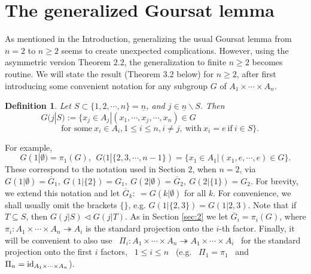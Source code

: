 \documentclass[11pt]{article}
\theoremstyle{change}
\newtheorem{Def}[Thm]{Definition}
\newcommand{\<}{\langle}
\renewcommand{\>}{\rangle}
\begin{document}





\section{The generalized Goursat lemma } \label{sec:3}

As mentioned in the Introduction, generalizing the usual Goursat lemma from $n=2$ to $n\geq 2$ seems to create unexpected complications. However, using the asymmetric version Theorem $2.2$, the generalization to finite $n\geq 2$ becomes routine. We will state the result (Theorem 3.2 below) for $n\geq 2$,
after
first introducing some convenient notation for any subgroup $G$ of  $A_1\times \cdots \times A_n$.

\begin{Def}\label{d:3.1}
 Let $S\subset \{1,2,\cdots,n\}=\underline{n}$, and $j\in \underline{n}\smallsetminus S$. Then $$G(j|S):=\{x_j\in A_j|(x_1,\cdots,x_j,\cdots,x_n)\in G~~~~~~~~~~~~~~~~~~~~~~~~~~~~~~~~~~~~~~~~$$ $$~~~~~\mbox{for some}~x_i\in A_i, 1\leq i \leq n, i\neq j,
 ~\mbox{with}~x_i=e ~\mbox{if}~i\in S \}.$$
\end{Def}
For example, $$G(1|\emptyset)=\pi_1(G),~~G(1|\{2,3,\cdots, n-1\})=\{x_1\in A_1|(x_1,e,\cdots,e)\in G\}.$$ These correspond to the notation used in Section $2$, when $n=2$, via $G(1|\emptyset)=\overline{G}_1, ~G(1|\{2\})=G_1, ~G(2|\emptyset)=\overline{G}_2, ~G(2|\{1\})=G_2.$   For brevity, we extend this notation and let $\overline{G}_k :~= G(k|\emptyset)$ for all $k$.  
For convenience, we shall usually omit the brackets $\{\}$, e.g. $G(1|\{2,3\})=G(1|2,3)$. Note that if $T\subseteq S$, then $G(j|S)\lhd G(j|T)$.
As in Section \ref{sec:2} we let $\overline{G}_i=\pi_i(G)$, where $\pi_i:A_1\times \cdots \times A_n \twoheadrightarrow A_i$ is the standard projection onto the $i$-th factor.
Finally, it will be convenient to also use \ $\Pi_i : A_1 \times \cdots \times A_n 
\twoheadrightarrow  A_1 \times \cdots \times A_i$ \ for the standard projection onto the
first $i$ factors, \ $1 \leq i \leq n$ \ (e.g. \ $\Pi_1 = \pi_1$ \ and \ $\Pi_n = 
{\rm id}_{A_1 \times \cdots \times A_n} $).
\end{document}
